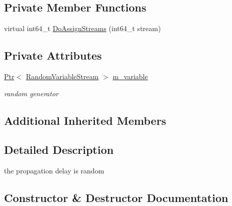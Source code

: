 \subsection*{Private Member Functions}
\begin{DoxyCompactItemize}
\item 
virtual int64\+\_\+t \hyperlink{classns3_1_1RandomPropagationDelayModel_adec044cce2bb94ce75ffc8fff6f5e387}{Do\+Assign\+Streams} (int64\+\_\+t stream)
\end{DoxyCompactItemize}
\subsection*{Private Attributes}
\begin{DoxyCompactItemize}
\item 
\hyperlink{classns3_1_1Ptr}{Ptr}$<$ \hyperlink{classns3_1_1RandomVariableStream}{Random\+Variable\+Stream} $>$ \hyperlink{classns3_1_1RandomPropagationDelayModel_a1f026b6a646d862d0eca4ba3906cd8a2}{m\+\_\+variable}
\begin{DoxyCompactList}\small\item\em random generator \end{DoxyCompactList}\end{DoxyCompactItemize}
\subsection*{Additional Inherited Members}


\subsection{Detailed Description}
the propagation delay is random 

\subsection{Constructor \& Destructor Documentation}
